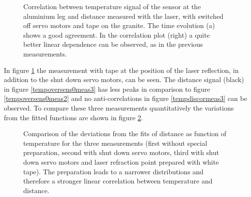 \documentclass[
a4paper,                                %
twoside,                                %
BCOR1.4cm,                      %
10pt,                           %
headings=normal,                %
headsepline,                    %
clearplainpage, %
final,                                  %
div=14,
parskip=full,
openright,
bibliography=toc
]{scrreprt}
\begin{document}
\begin{figure}[H]	
	\centering
	\qquad
	\caption{Correlation between temperature signal of the sensor at the aluminium leg and distance measured with the laser, with switched off servo motors and tape on the granite. The time evolution (a) shows a good agreement. In the correlation plot (right) a quite better linear dependence can be observed, as in the previous measurements.}
	\label{tempdismeas3}
\end{figure} 

In figure \ref{tempdismeas3} the measurement with tape at the position of the laser reflection, in addition to the shut down servo motors, can be seen. The distance signal (black) in figure \ref*{tempoversens0meas3} has less peaks in comparison to figure \ref{tempoversens0meas2} and no anti-correlations in figure \ref{tempdiscormeas3} can be observed. To compare these three measurements quantitatively the variations from the fitted functions are shown in figure  \ref{disresall}.

\begin{figure}[H]	
	\centering
	\caption{Comparison of the deviations from the fits of distance as function of temperature for the three measurements (first without special preparation, second with shut down servo motors, third with shut down servo motors and laser refraction point prepared with white tape). The preparation leads to a narrower distributions and therefore a stronger linear correlation between temperature and distance.}
	\label{disresall}
\end{figure}
\end{document}
